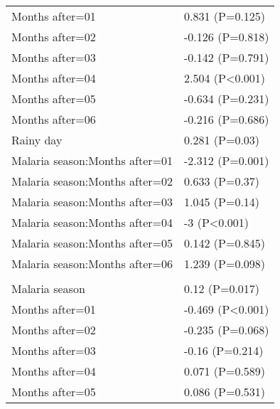 \documentclass[]{article}
\begin{document}
\begin{longtable}[t]{ll}
\hspace{1em}Months after=01 & 0.831 (P=0.125)\\
\hspace{1em}Months after=02 & -0.126 (P=0.818)\\
\hspace{1em}Months after=03 & -0.142 (P=0.791)\\
\hspace{1em}Months after=04 & 2.504 (P<0.001)\\
\hspace{1em}Months after=05 & -0.634 (P=0.231)\\
\hspace{1em}Months after=06 & -0.216 (P=0.686)\\
\hspace{1em}Rainy day & 0.281 (P=0.03)\\
\hspace{1em}Malaria season:Months after=01 & -2.312 (P=0.001)\\
\hspace{1em}Malaria season:Months after=02 & 0.633 (P=0.37)\\
\hspace{1em}Malaria season:Months after=03 & 1.045 (P=0.14)\\
\hspace{1em}Malaria season:Months after=04 & -3 (P<0.001)\\
\hspace{1em}Malaria season:Months after=05 & 0.142 (P=0.845)\\
\hspace{1em}Malaria season:Months after=06 & 1.239 (P=0.098)\\
\addlinespace[1.5em]
\multicolumn{2}{l}{\textbf{Temporary field worker}}\\
\hspace{1em}Malaria season & 0.12 (P=0.017)\\
\hspace{1em}Months after=01 & -0.469 (P<0.001)\\
\hspace{1em}Months after=02 & -0.235 (P=0.068)\\
\hspace{1em}Months after=03 & -0.16 (P=0.214)\\
\hspace{1em}Months after=04 & 0.071 (P=0.589)\\
\hspace{1em}Months after=05 & 0.086 (P=0.531)\\

\end{longtable}
\end{document}
